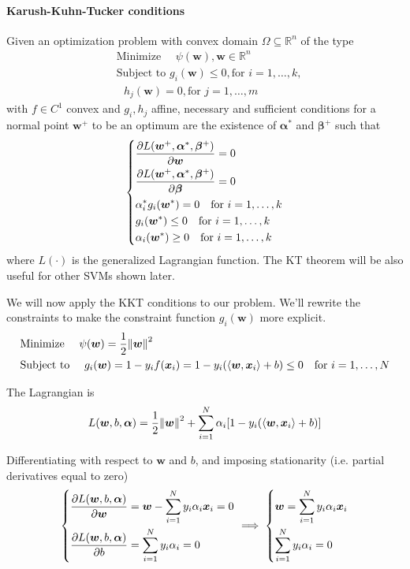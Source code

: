 \documentclass[oneside,onecolumn]{report}
\newcommand{\inp}[2]{\left\langle #1, #2 \right\rangle}
\begin{document}
\paragraph{Karush-Kuhn-Tucker conditions}
Given an optimization problem with convex domain $\Omega \subseteq \mathbb R^n$ of the type
\begin{align*}
    &\text{Minimize   } \quad \psi(\bm w), \bm w \in \mathbb R^n \\
    &\text{Subject to } g_i(\bm w) \leq 0, \text{for } i = 1, \dots, k, \\
    &\text{           } h_j(\bm w) = 0, \text{for } j = 1, \dots, m
\end{align*}
with $f \in C^1$ convex and $g_i, h_j$ affine, necessary and sufficient conditions for a normal point $\bm w^+$ to be an optimum are the existence of $\bm \alpha^*$ and $\bm \beta^+$ such that
$$
\begin{dcases}
    \pdv{L(\bm w^+, \bm \alpha^*, \bm \beta^+)}{\bm w} = 0 \\
    \pdv{L(\bm w^+, \bm \alpha^*, \bm \beta^+)}{\bm \beta} = 0 \\
    \alpha_i^* g_i(\bm w^*) = 0 \quad \text{for } i = 1, \dots, k \\
    g_i(\bm w^*) \leq 0 \quad \text{for } i = 1, \dots, k \\
    \alpha_i(\bm w^*) \geq 0 \quad \text{for } i = 1, \dots, k \\
\end{dcases}
$$
where $L(\cdot)$ is the generalized Lagrangian function.
The KT theorem will be also useful for other SVMs shown later.

We will now apply the KKT conditions to our problem.
We'll rewrite the constraints to make the constraint function $g_i(\bm w)$ more explicit.
\begin{align*}
    &\text{Minimize   } \quad \psi(\bm w) = \frac{1}{2} \norm{\bm w}^2 \\
    &\text{Subject to } \quad g_i(\bm w) = 1 - y_i f(\bm x_i) = 1 - y_i (\inp{\bm w}{\bm x_i} + b) \leq 0 \quad \text{for } i = 1, \dots, N
\end{align*}


The Lagrangian is
$$ L(\bm w, b, \bm \alpha) = \frac{1}{2} \norm{\bm w}^2 + \sum_{i = 1}^N \alpha_i [1 - y_i (\inp{\bm w}{\bm x_i} + b)] $$

Differentiating with respect to $\bm w$ and $b$, and imposing stationarity (i.e. partial derivatives equal to zero)
$$ \begin{dcases}
    \pdv{L(\bm w, b, \bm \alpha)}{\bm w} = \bm w - \sum_{i = 1}^N y_i \alpha_i \bm x_i = 0 \\
    \pdv{L(\bm w, b, \bm \alpha)}{b} = \sum_{i = 1}^N y_i \alpha_i = 0
\end{dcases} \implies
\begin{dcases}
    \bm w = \sum_{i = 1}^N y_i \alpha_i \bm x_i \\
    \sum_{i = 1}^N y_i \alpha_i = 0
\end{dcases}
$$
\end{document}
